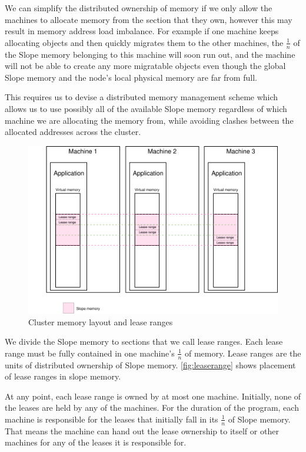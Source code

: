 We can simplify the distributed ownership of memory if we only allow the
machines to allocate memory from the section that they own, however this may
result in memory address load imbalance. For example if one machine keeps
allocating objects and then quickly migrates them to the other machines, the
$\frac{1}{n}$ of the Slope memory belonging to this machine will soon run out,
and the machine will not be able to create any more migratable objects
even though the global Slope memory and the node's local physical memory are
far from full.

This requires us to devise a distributed memory management scheme which allows
us to use possibly all of the available Slope memory regardless of which
machine we are allocating the memory from, while avoiding clashes
between the allocated addresses across the cluster.


\begin{figure}[t]
\centering
{}
\includegraphics[width=1\textwidth]{leaserange.drawio}
\caption{
    Cluster memory layout and lease ranges
}
\label{fig:leaserange}
\end{figure}


We divide the Slope memory to sections that we call lease ranges. Each lease
range must be fully contained in one machine's $\frac{1}{n}$ of memory.
Lease ranges are the units of distributed ownership of Slope memory.
\autoref{fig:leaserange} shows placement of lease ranges
in slope memory.


At any point, each lease range is owned by at most
one machine. Initially, none of the leases are held by any of the machines.
For the duration of the program, each machine is responsible for
the leases that initially fall in its $\frac{1}{n}$ of Slope memory.
That means the machine can hand out
the lease ownership to itself or other machines for any of the leases it is
responsible for.


